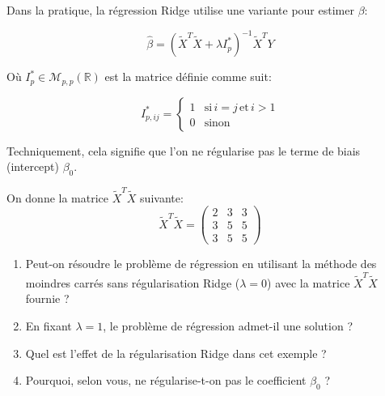 \documentclass[solutions]{../exercices}
\begin{document}
\begin{exercice}
Dans la pratique, la régression Ridge utilise une variante pour estimer $\beta$:

\begin{equation}
	\hat{\beta} = \left( \tilde{X}^T \tilde{X} + \lambda I_p^* \right)^{-1} \tilde{X}^T Y
	\label{eqn:ridge-2}
\end{equation}

Où $I_p^* \in \mathcal{M}_{p,p}(\mathbb{R})$ est la matrice définie comme suit:

\begin{equation}
	I_{p,ij}^* = \begin{cases}
		1 & \text{si} \, i = j \, \text{et} \, i > 1 \\
		0 & \text{sinon}
	\end{cases}
	\nonumber
\end{equation}

Techniquement, cela signifie que l'on ne régularise pas le terme de biais (intercept) $\beta_0$.

On donne la matrice $\tilde{X}^T \tilde{X}$ suivante:
\begin{equation}
	\tilde{X}^T \tilde{X} = 
	\begin{pmatrix}
		2 & 3 & 3 \\
		3 & 5 & 5 \\
		3 & 5 & 5
	\end{pmatrix}
	\nonumber
\end{equation}

\begin{enumerate}
	\item Peut-on résoudre le problème de régression en utilisant la méthode des moindres carrés sans régularisation Ridge ($\lambda = 0$) avec la matrice $\tilde{X}^T \tilde{X}$ fournie ?
	\item En fixant $\lambda = 1$, le problème de régression admet-il une solution ?
	\item Quel est l'effet de la régularisation Ridge dans cet exemple ?
	\item Pourquoi, selon vous, ne régularise-t-on pas le coefficient $\beta_0$ ?
\end{enumerate}

\end{exercice}
\end{document}
